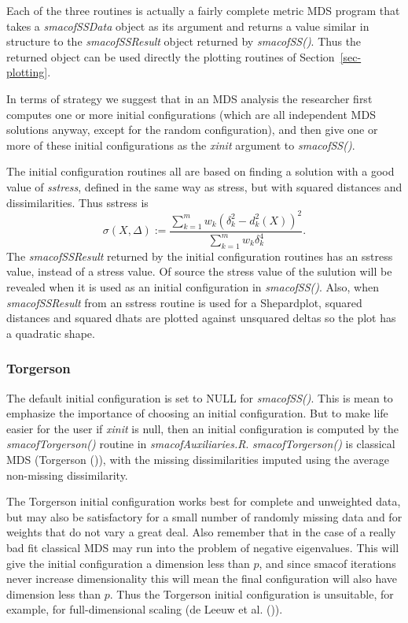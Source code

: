 \documentclass[
  12pt,
  letterpaper,
  DIV=11,
  numbers=noendperiod]{scrartcl}
\begin{document}
Each of the three routines is actually a fairly complete metric MDS
program that takes a \emph{smacofSSData} object as its argument and
returns a value similar in structure to the \emph{smacofSSResult} object
returned by \emph{smacofSS()}. Thus the returned object can be used
directly the plotting routines of Section~\ref{sec-plotting}.

In terms of strategy we suggest that in an MDS analysis the researcher
first computes one or more initial configurations (which are all
independent MDS solutions anyway, except for the random configuration),
and then give one or more of these initial configurations as the
\emph{xinit} argument to \emph{smacofSS()}.

The initial configuration routines all are based on finding a solution
with a good value of \emph{sstress}, defined in the same way as stress,
but with squared distances and dissimilarities. Thus sstress is
\begin{equation}
  \sigma(X,\Delta) := \frac{\sum_{k=1}^mw_k(\delta_k^2 - d_k^2(X))^2}{\sum_{k=1}^mw_k\delta_k^4}. \label{eq-sstressdef}
\end{equation} The \emph{smacofSSResult} returned by the initial
configuration routines has an sstress value, instead of a stress value.
Of source the stress value of the sulution will be revealed when it is
used as an initial configuration in \emph{smacofSS()}. Also, when
\emph{smacofSSResult} from an sstress routine is used for a Shepardplot,
squared distances and squared dhats are plotted against unsquared deltas
so the plot has a quadratic shape.

\subsubsection{Torgerson}\label{sec-torgerson}

The default initial configuration is set to NULL for \emph{smacofSS()}.
This is mean to emphasize the importance of choosing an initial
configuration. But to make life easier for the user if \emph{xinit} is
null, then an initial configuration is computed by the
\emph{smacofTorgerson()} routine in \emph{smacofAuxiliaries.R}.
\emph{smacofTorgerson()} is classical MDS (Torgerson
()), with the missing dissimilarities
imputed using the average non-missing dissimilarity.

The Torgerson initial configuration works best for complete and
unweighted data, but may also be satisfactory for a small number of
randomly missing data and for weights that do not vary a great deal.
Also remember that in the case of a really bad fit classical MDS may run
into the problem of negative eigenvalues. This will give the initial
configuration a dimension less than \(p\), and since smacof iterations
never increase dimensionality this will mean the final configuration
will also have dimension less than \(p\). Thus the Torgerson initial
configuration is unsuitable, for example, for full-dimensional scaling
({de Leeuw et al.} ()).
\end{document}

